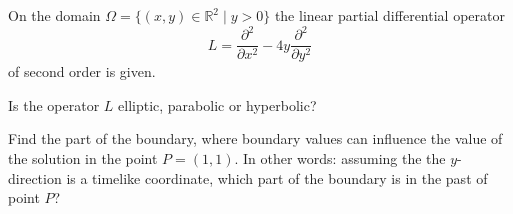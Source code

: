 On the domain $\Omega=\{(x,y)\in\mathbb{R}^2 \mid y>0\}$
the linear partial differential operator
\begin{equation}
L=
\frac{\partial^2}{\partial x^2}
-
4y
\frac{\partial^2}{\partial y^2}
\label{90000034:operator}
\end{equation}
of second order is given.
\begin{teilaufgaben}
\item
Is the operator $L$ elliptic, parabolic or hyperbolic?
\item
Find the part of the boundary, where boundary values can influence the
value of the solution in the point $P=(1,1)$.
In other words: assuming the the $y$-direction is a timelike 
coordinate, which part of the boundary is in the past of point $P$?
\end{teilaufgaben}

